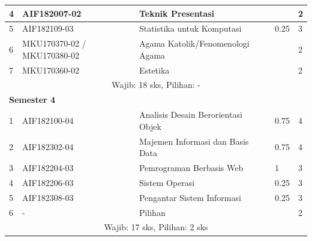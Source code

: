 \begin{table}[H]
\begin{tabular}{|p{0.5cm}|p{2.85cm}|p{4.95cm}|p{2.7cm}|p{2.7cm}|}
			4 &	AIF182007-02 &	Teknik Presentasi &  &	2  \\ \hline
			5 &	AIF182109-03 &	Statistika untuk Komputasi &	0.25 &	3  \\ \hline
			6 &	MKU170370-02 / MKU170380-02 &	Agama Katolik/Fenomenologi Agama & &	2  \\ \hline
			7 &	MKU170360-02 &	Estetika & &	2  \\ \hline
			\multicolumn{5}{|c|}{Wajib: 18 sks, Pilihan: -} \\ \hline
			\multicolumn{5}{|l|}{\textbf{Semester 4}} \\ \hline
			1	& AIF182100-04 &	Analisis Desain Berorientasi Objek &	0.75 &	4  \\ \hline
			2	& AIF182302-04 &	Majemen Informasi dan Basis Data &	0.75 &	4  \\ \hline
			3	& AIF182204-03 &	Pemrograman Berbasis Web &	1 &	3  \\ \hline
			4	& AIF182206-03 &	Sistem Operasi &	0.25 &	3  \\ \hline
			5 &	AIF182308-03 &	Pengantar Sistem Informasi &	0.25 &	3  \\ \hline
			6 &	- &	Pilihan &	&	2  \\ \hline
			\multicolumn{5}{|c|}{Wajib: 17 sks, Pilihan: 2 sks} \\ \hline
		\end{tabular}
	\label{tab:strukturkurikulum2018}
\end{table}

